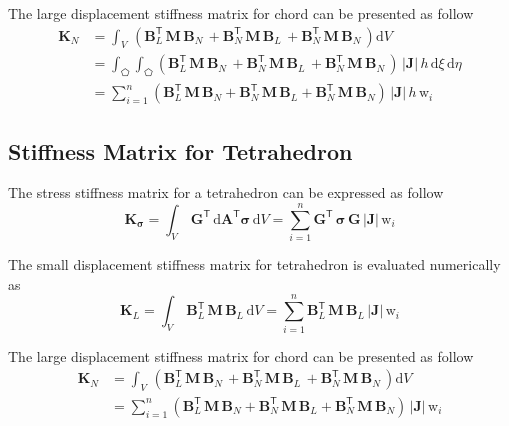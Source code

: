 The large displacement stiffness matrix for chord can be presented as follow
\begin{equation}
\begin{aligned}
\mathbf{K}_{N} & =  \int_{V} \,  \left(\mathbf{B}_L^{\mathsf{T}} \, \mathbf{M} \, \mathbf{B}_N \, + \mathbf{B}_N^{\mathsf{T}} \, \mathbf{M} \, \mathbf{B}_L \, + \mathbf{B}_N^{\mathsf{T}} \, \mathbf{M} \, \mathbf{B}_N \,  \right) \mathrm{d} V \\
& = \int_{\pentagon} \int_{\pentagon} \left(\mathbf{B}_L^{\mathsf{T}} \, \mathbf{M} \, \mathbf{B}_N \, + \mathbf{B}_N^{\mathsf{T}} \, \mathbf{M} \, \mathbf{B}_L \, + \mathbf{B}_N^{\mathsf{T}} \, \mathbf{M} \, \mathbf{B}_N \,  \right)  \, |\mathbf{J}|\, h \, \mathrm{d} \xi \, \mathrm{d} \eta \\
& = \sum_{i=1}^{n}  \left(\mathbf{B}_L^{\mathsf{T}} \, \mathbf{M} \, \mathbf{B}_N + \mathbf{B}_N^{\mathsf{T}} \, \mathbf{M} \, \mathbf{B}_L + \mathbf{B}_N^{\mathsf{T}} \, \mathbf{M} \, \mathbf{B}_N \right) \, |\mathbf{J}| \, h \, \mathrm{w}_i
\end{aligned}
\end{equation}

\subsection{Stiffness Matrix for Tetrahedron}
The stress stiffness matrix for a tetrahedron can be expressed as follow
\begin{equation}
\mathbf{K}_{\boldsymbol{\sigma}} = \int_{V} \, \mathbf{G}^{\mathsf{T}} \, \mathrm{d} \mathbf{A}^{\mathsf{T}} \boldsymbol{\sigma} \, \mathrm{d} V
=  \sum_{i=1}^{n}  \mathbf{G}^{\mathsf{T}} \,  \boldsymbol{\sigma} \, \mathbf{G} \, |\mathbf{J}| \, \mathrm{w}_i
\end{equation}   

The small displacement stiffness matrix for tetrahedron is evaluated numerically as 
\begin{equation}
\mathbf{K}_{L} = \int_{V} \, \mathbf{B}_L^{\mathsf{T}} \, \mathbf{M} \, \mathbf{B}_L \, \mathrm{d} V  =  \sum_{i=1}^{n}  \mathbf{B}_L^{\mathsf{T}} \, \mathbf{M} \, \mathbf{B}_L \, |\mathbf{J}| \, \mathrm{w}_i
\end{equation}

The large displacement stiffness matrix for chord can be presented as follow
\begin{equation}
\begin{aligned}
\mathbf{K}_{N} & =  \int_{V} \,  \left(\mathbf{B}_L^{\mathsf{T}} \, \mathbf{M} \, \mathbf{B}_N \, + \mathbf{B}_N^{\mathsf{T}} \, \mathbf{M} \, \mathbf{B}_L \, + \mathbf{B}_N^{\mathsf{T}} \, \mathbf{M} \, \mathbf{B}_N \,  \right) \mathrm{d} V \\
& = \sum_{i=1}^{n}  \left(\mathbf{B}_L^{\mathsf{T}} \, \mathbf{M} \, \mathbf{B}_N + \mathbf{B}_N^{\mathsf{T}} \, \mathbf{M} \, \mathbf{B}_L + \mathbf{B}_N^{\mathsf{T}} \, \mathbf{M} \, \mathbf{B}_N \right) \, |\mathbf{J}| \, \mathrm{w}_i
\end{aligned}
\end{equation}


